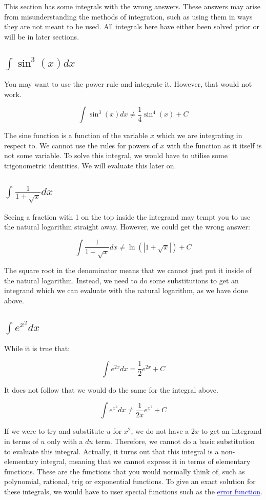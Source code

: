 \documentclass[12pt]{article}
\begin{document}
This section has some integrals with the wrong answers.
These answers may arise from misunderstanding the methods of integration, such as using them in ways they are not meant to be used.
All integrals here have either been solved prior or will be in later sections.

\subsection{$\int \sin^3(x) dx$}

You may want to use the power rule and integrate it. However, that would not work.

$$
    \int \sin^3(x) dx \neq \frac{1}{4}\sin^4(x) + C
$$

The sine function is a function of the variable $x$ which we are integrating in respect to.
We cannot use the rules for powers of $x$ with the function as it itself is not some variable.
To solve this integral, we would have to utilise some trigonometric identities.
We will evaluate this later on.

\subsection{$\int \frac{1}{1+\sqrt{x}} dx$}

Seeing a fraction with 1 on the top inside the integrand may tempt you to use the natural logarithm straight away.
However, we could get the wrong answer:

$$
    \int \frac{1}{1+\sqrt{x}} dx \neq \ln(|1+\sqrt{x}|) + C
$$

The square root in the denominator means that we cannot just put it inside of the natural logarithm.
Instead, we need to do some substitutions to get an integrand which we can evaluate with the natural logarithm, as we have done above.

\subsection{$\int e^{x^2} dx$}

While it is true that:

$$
    \int e^{2x} dx = \frac{1}{2}e^{2x} + C
$$

It does not follow that we would do the same for the integral above.

$$
    \int e^{x^2} dx \neq \frac{1}{2x}e^{x^2} + C
$$

If we were to try and substitute $u$ for $x^2$, we do not have a $2x$ to get an integrand in terms of $u$ only with a $du$ term.
Therefore, we cannot do a basic substitution to evaluate this integral.
Actually, it turns out that this integral is a non-elementary integral, meaning that we cannot express it in terms of elementary functions.
These are the functions that you would normally think of, such as polynomial, rational, trig or exponential functions.
To give an exact solution for these integrals, we would have to user special functions such as the \href{https://en.wikipedia.org/wiki/Error_function}{\textcolor{blue}{{\underline{error function}}}}.
\end{document}
